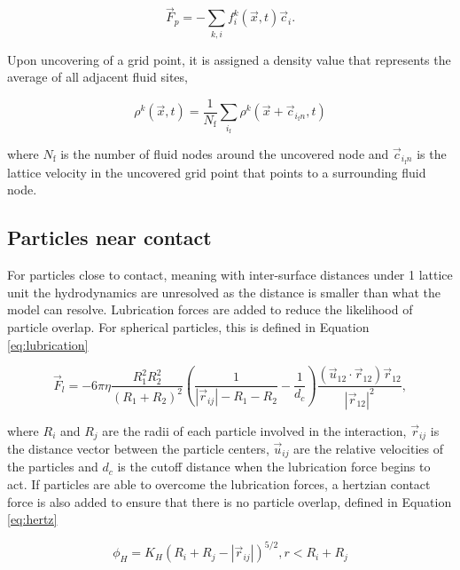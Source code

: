 \begin{equation}
    \vec{F}_p = -\sum_{k,i} f_i^k(\vec{x},t)\vec{c}_i .
\end{equation}

Upon uncovering of a grid point, it is assigned a density value that represents the average of all adjacent fluid sites,

\begin{equation}
    \rho^k(\vec{x},t) = \frac{1}{N_{\text{f}}} \sum_{i_{\text{f}}} \rho^k(\vec{x}+\vec{c}_{i_{\text{f}}n}, t)
    \label{eq:fill_particles}
\end{equation}

where $N_{\text{f}}$ is the number of fluid nodes around the uncovered node and $\vec{c}_{i_{\text{f}}n}$ is the lattice velocity 
in the uncovered grid point that points to a surrounding fluid node.

\subsection{Particles near contact}
\label{section:particles_near_contact}

For particles close to contact, meaning with inter-surface distances under 1 lattice unit the hydrodynamics are unresolved as the
distance is smaller than what the model can resolve. Lubrication forces are added to reduce the likelihood of particle overlap. For 
spherical particles, this is defined in Equation \eqref{eq:lubrication}

\begin{equation}
    \vec{F}_l = -6 \pi \eta \frac{R_1^2 R_2^2}{\left(R_1+R_2\right)^2}\left(\frac{1}{|\vec{r}_{ij}|-R_1-R_2}-\frac{1}{d_c}\right) \frac{\left(\vec{u}_{12}\cdot\vec{r}_{12}\right)\vec{r}_{12}}{|\vec{r}_{12}|^2} ,%
    \label{eq:lubrication}
\end{equation}

where $R_i$ and $R_j$ are the radii of each particle involved in the interaction, $\vec{r}_{ij}$ is the distance
vector between the particle centers, $\vec{u}_{ij}$ are the relative velocities of the particles and $d_c$ 
is the cutoff distance when the lubrication force begins to act. If particles are able to overcome the lubrication forces, 
a hertzian contact force is also added to ensure that there is no particle overlap, defined in Equation \eqref{eq:hertz}

\begin{equation}
    \phi_{H} = K_{H}(R_i + R_j - |\vec{r}_{ij}|)^{5/2}, r < R_i + R_j
    \label{eq:hertz}
\end{equation}

